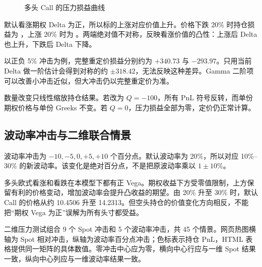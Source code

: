 \documentclass[UTF8,a4paper,12pt]{ctexart}
\begin{document}
\begin{table}[H]\centering

\caption{标的价格完整重定价实验}
\end{table}

\begin{figure}[H]\centering
{}
\caption{多头 Call 的压力损益曲线}
\end{figure}

默认看涨期权 Delta 为正，所以标的上涨对应价值上升。价格下跌 20\% 时持仓损益为 \SpotDown，上涨 20\% 时为 \SpotUp。两端绝对值不对称，反映看涨价值的凸性：上涨后 Delta 也上升，下跌后 Delta 下降。

以正负 5\% 冲击为例，完整重定价损益分别约为 $+340.73$ 与 $-293.97$。只用当前 Delta 做一阶估计会得到对称的约 $\pm318.42$，无法反映这种差异。Gamma 二阶项可以改善小冲击近似，但大冲击仍以完整重定价为准。

数量改变只线性缩放持仓结果。若改为 $Q=-100$，所有 PnL 符号反转，而单份期权价格与单份 Greeks 不变。若 $Q=0$，压力损益全部为零，定价仍正常计算。
\newpage

\subsection{波动率冲击与二维联合情景}
波动率冲击为 $-10,-5,0,+5,+10$ 个百分点。默认波动率为 20\%，所以对应 10\%--30\% 的新波动率。该变化是绝对百分点，不是把原波动率乘以 $1\pm10\%$。

\begin{table}[H]\centering

\caption{波动率冲击的完整重定价实验}
\end{table}

多头欧式看涨和看跌在本模型下都有正 Vega。期权收益下方受零值限制，上方保留有利的价格变动，增加波动率会提升凸收益的期望。由 20\% 升至 30\% 时，默认 Call 的价格从约 10.4506 升至 14.2313。但空头持仓的价值变化方向相反，不能把“期权 Vega 为正”误解为所有头寸都受益。

二维压力测试组合 9 个 Spot 冲击和 5 个波动率冲击，共 45 个情景。网页热图横轴为 Spot 相对冲击，纵轴为波动率百分点冲击；色标表示持仓 PnL，HTML 表格提供同一矩阵的具体数值。零冲击中心应为零，横向中心行应与一维 Spot 结果一致，纵向中心列应与一维波动率结果一致。
\end{document}
